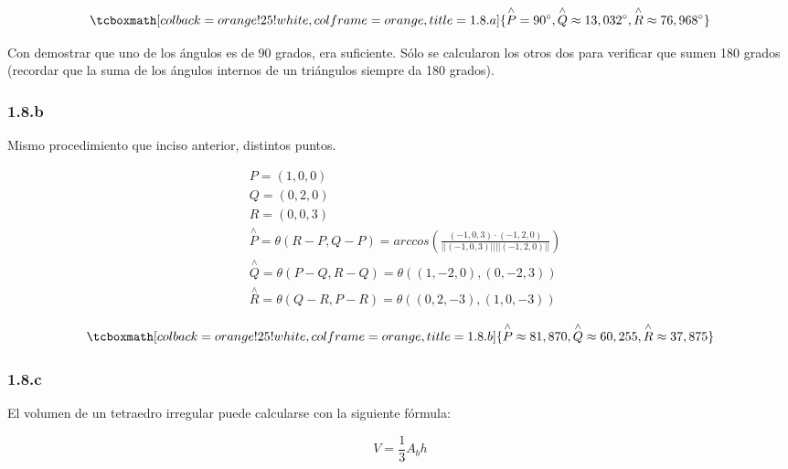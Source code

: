 \documentclass{article}
\begin{document}
\begin{equation}
\tcboxmath[colback=orange!25!white,colframe=orange, title=1.8.a]
{ \overset{\wedge}{P} = 90^{\circ}, \overset{\wedge}{Q} \approx 13,032^{\circ}, \overset{\wedge}{R} \approx 76,968^{\circ} }
\end{equation}

Con demostrar que uno de los ángulos es de 90 grados, era suficiente. Sólo se calcularon los otros dos para verificar que sumen 180 grados (recordar que la suma de los ángulos internos de un triángulos siempre da 180 grados).

\subsubsection*{1.8.b}
\label{subsubsec:1.8.b}

Mismo procedimiento que inciso anterior, distintos puntos.

\begin{subequations}
\begin{align}
& P = (1, 0, 0) \\
& Q = (0, 2, 0) \\
& R = (0, 0, 3) \\
& \overset{\wedge}{P} = \theta(R-P, Q-P) = arccos \left(\frac{(-1,0,3) \cdot (-1, 2, 0)}{||(-1, 0, 3)|| ||(-1,2,0)||} \right) \\
& \overset{\wedge}{Q} = \theta(P-Q, R-Q) = \theta((1,-2,0),(0, -2, 3)) \\
& \overset{\wedge}{R} = \theta(Q-R, P-R) = \theta((0,2,-3),(1, 0, -3))
\end{align}
\end{subequations}

\begin{equation}
\tcboxmath[colback=orange!25!white,colframe=orange, title=1.8.b]
{ \overset{\wedge}{P} \approx 81,870, \overset{\wedge}{Q} \approx 60,255, \overset{\wedge}{R} \approx 37,875 }
\end{equation}

\subsubsection*{1.8.c}
\label{subsubsec:1.8.c}

El volumen de un tetraedro irregular puede calcularse con la siguiente fórmula:

\begin{equation}
V = \frac{1}{3} A_b h \label{eq:voltetr}
\end{equation}
\end{document}
